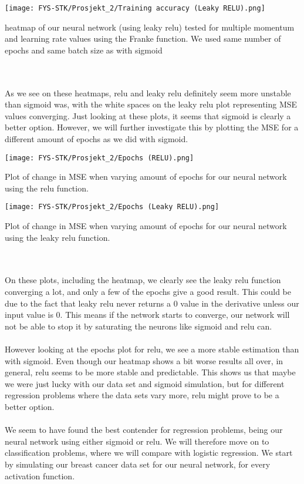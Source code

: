 \documentclass[english,notitlepage,reprint,nofootinbib]{revtex4-1}  %
\begin{document}
\texttt{[image: FYS-STK/Prosjekt\_2/Training accuracy (Leaky RELU).png]}
\caption{heatmap of our neural network (using leaky relu) tested for multiple momentum and learning rate values using the Franke function. We used same number of epochs and same batch size as with sigmoid}
\\
\\
As we see on these heatmaps, relu and leaky relu definitely seem more unstable than sigmoid was, with the white spaces on the leaky relu plot representing MSE values converging. Just looking at these plots, it seems that sigmoid is clearly a better option. However, we will further investigate this by plotting the MSE for a different amount of epochs as we did with sigmoid. 

\texttt{[image: FYS-STK/Prosjekt\_2/Epochs (RELU).png]}
\caption{Plot of change in MSE when varying amount of epochs for our neural network using the relu function.}

\texttt{[image: FYS-STK/Prosjekt\_2/Epochs (Leaky RELU).png]}
\caption{Plot of change in MSE when varying amount of epochs for our neural network using the leaky relu function.}
\\
\\
On these plots, including the heatmap, we clearly see the leaky relu function converging a lot, and only a few of the epochs give a good result. This could be due to the fact that leaky relu never returns a $0$ value in the derivative unless our input value is $0$. This means if the network starts to converge, our network will not be able to stop it by saturating the neurons like sigmoid and relu can. 
\\
\\
However looking at the epochs plot for relu, we see a more stable estimation than with sigmoid. Even though our heatmap shows a bit worse results all over, in general, relu seems to be more stable and predictable. This shows us that maybe we were just lucky with our data set and sigmoid simulation, but for different regression problems where the data sets vary more, relu might prove to be a better option. 
\\
\\
We seem to have found the best contender for regression problems, being our neural network using either sigmoid or relu. We will therefore move on to classification problems, where we will compare with logistic regression. We start by simulating our breast cancer data set for our neural network, for every activation function.
\end{document}
